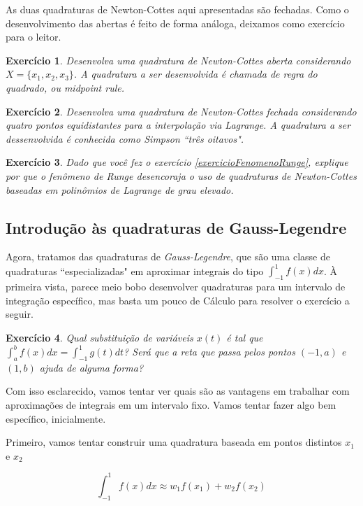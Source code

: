 \documentclass[]{article}
\newtheorem{exercicio}{Exercício}
\numberwithin{equation}{section}
\begin{document}
As duas quadraturas de Newton-Cottes aqui apresentadas são fechadas. Como o desenvolvimento das abertas é feito de forma análoga, deixamos como exercício para o leitor.

\begin{exercicio}
	Desenvolva uma quadratura de Newton-Cottes aberta considerando $X = \{x_1, x_2, x_3\}$. A quadratura a ser desenvolvida é chamada de regra do quadrado, ou \emph{midpoint rule}.
\end{exercicio}

\begin{exercicio}
	Desenvolva uma quadratura de Newton-Cottes fechada considerando quatro pontos equidistantes para a interpolação via Lagrange. A quadratura a ser dessenvolvida é conhecida como Simpson ``três oitavos".
\end{exercicio}

\begin{exercicio}
	Dado que você fez o exercício \ref{exercicioFenomenoRunge}, explique por que o fenômeno de Runge desencoraja o uso de quadraturas de Newton-Cottes baseadas em polinômios de Lagrange de grau elevado.
\end{exercicio}

\subsection{Introdução às quadraturas de Gauss-Legendre}

Agora, tratamos das quadraturas de \emph{Gauss-Legendre}, que são uma classe de quadraturas ``especializadas" em aproximar integrais do tipo $\int_{-1}^{1} f(x) dx$. À primeira vista, parece meio bobo desenvolver quadraturas para um intervalo de integração específico, mas basta um pouco de Cálculo para resolver o exercício a seguir.

\begin{exercicio}
	Qual substituição de variáveis $x(t)$ é tal que $\int_{a}^{b} f(x) dx = \int_{-1}^{1} g(t) dt$? Será que a reta que passa pelos pontos $(-1, a)$ e $(1, b)$ ajuda de alguma forma?
\end{exercicio}

Com isso esclarecido, vamos tentar ver quais são as vantagens em trabalhar com aproximações de integrais em um intervalo fixo. Vamos tentar fazer algo bem específico, inicialmente.

Primeiro, vamos tentar construir uma quadratura baseada em pontos distintos $x_1$ e $x_2$

$$
\int_{-1}^{1} f(x) dx \approx w_1 f(x_1) + w_2 f(x_2)
$$
\end{document}
